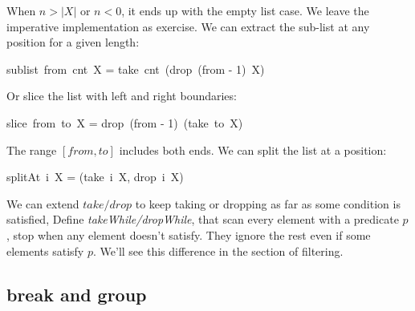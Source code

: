 \documentclass[b5paper]{article}
\begin{document}
When $n > |X|$ or $n < 0$, it ends up with the empty list case. We leave the imperative implementation as exercise. We can extract the sub-list at any position for a given length:

\be
sublist\ from\ cnt\ X = take\ cnt\ (drop\ (from - 1)\ X)
\ee

Or slice the list with left and right boundaries:

\be
slice\ from\ to\ X = drop\ (from - 1)\ (take\ to\ X)
\ee

The range $[from, to]$ includes both ends. We can split the list at a position:

\be
splitAt\ i\ X = (take\ i\ X, drop\ i\ X)
\label{eq:split-at}
\ee

 
We can extend $take/drop$ to keep taking or dropping as far as some condition is satisfied, Define \textit{takeWhile/dropWhile}, that scan every element with a predicate $p$, stop when any element doesn't satisfy. They ignore the rest even if some elements satisfy $p$. We'll see this difference in the section of filtering.

\be
{}
\ee

\subsection{break and group}
 
\end{document}
